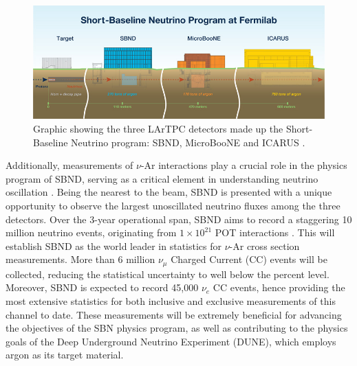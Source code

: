 \begin{figure}[htbp] 
\centering    
\includegraphics[width=1.0\textwidth]{SBN_program}
\caption[Short-Baseline Neutrino Program]{
Graphic showing the three LArTPC detectors made up the Short-Baseline Neutrino program: SBND, MicroBooNE and ICARUS \cite{SBNProgram}.
}
\label{fig:SBN_program}
\end{figure}

Additionally, measurements of $\nu$-Ar interactions play a crucial role in the physics program of SBND, serving as a critical element in understanding neutrino oscillation \cite{NuSTECWhitePaper}. 
Being the nearest to the beam, SBND is presented with a unique opportunity to observe the largest unoscillated neutrino fluxes among the three detectors.
Over the 3-year operational span, SBND aims to record a staggering 10 million neutrino events, originating from $1 \times 10^{21}$ POT interactions \cite{SBNProgram}.
This will establish SBND as the world leader in statistics for $\nu$-Ar cross section measurements.
More than 6 million $\nu_{\mu}$ Charged Current (CC) events will be collected, reducing the statistical uncertainty to well below the percent level.
Moreover, SBND is expected to record 45,000 $\nu_{e}$ CC events, hence providing the most extensive statistics for both inclusive and exclusive measurements of this channel to date.
These measurements will be extremely beneficial for advancing the objectives of the SBN physics program, as well as contributing to the physics goals of the Deep Underground Neutrino Experiment (DUNE), which employs argon as its target material.


